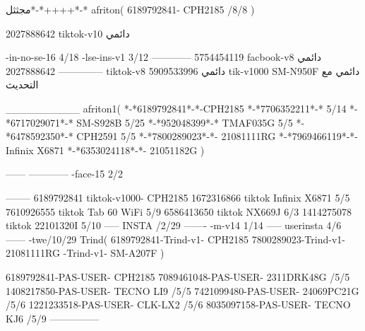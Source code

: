 مجثثل*-*++++*-*
afriton(
6189792841- CPH2185  /8/8
)

2027888642 tiktok-v10
دائمي

-in-no-se-16 4/18
-lse-ins-v1 3/12
------------
5754454119 facbook-v8
دائمي
--------------
2027888642 tiktok-v8
دائمي
5909533996 tik-v1000  SM-N950F
دائمي مع التحديث

__________
afriton1(
*-*6189792841*-*-CPH2185
*-*7706352211*-* 5/14
*-*6717029071*-*  SM-S928B 5/25
*-*952048399*-* TMAF035G 5/5
*-*6478592350*-* CPH2591 5/5
*-*7800289023*-*- 21081111RG \5\7
*-*7969466119*-*- Infinix X6871 \5
*-*6353024118*-*- 21051182G \5
)


------
------------
-face-15 2/2

--------
6189792841 tiktok-v1000- CPH2185 
1672316866 tiktok Infinix X6871  5/5
7610926555 tiktok Tab 60 WiFi  5/9
6586413650 tiktok NX669J  6/3
1414275078 tiktok 22101320I  5/10
-----
 INSTA /2/29
-------
-m-v14 1/14
-----
userinsta 4/6
------
-twe/10/29
Trind(
6189792841-Trind-v1- CPH2185 
7800289023-Trind-v1- 21081111RG \5-Trind-v1- SM-A207F \5\9
)

6189792841-PAS-USER- CPH2185 
7089461048-PAS-USER- 2311DRK48G /5/5
1408217850-PAS-USER- TECNO LI9 /5/5
7421099480-PAS-USER- 24069PC21G /5/6
1221233518-PAS-USER- CLK-LX2 /5/6
8035097158-PAS-USER- TECNO KJ6  /5/9
    ---------------
